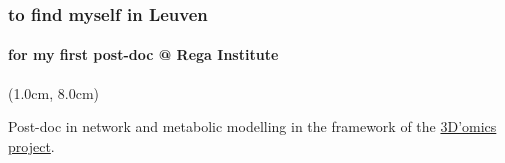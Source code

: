 \documentclass{beamer}
\begin{document}
   \begin{frame}
      \frametitle{to find myself in Leuven}
      \framesubtitle{for my first post-doc @ Rega Institute}
 


      \begin{textblock*}{10cm}(1.0cm, 8.0cm)

         \small Post-doc in network and metabolic modelling in the framework of the \href{https://3domics.eu}{3D'omics project}.

      \end{textblock*}



   \end{frame}


\end{document}
